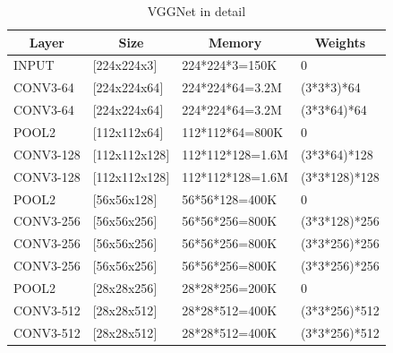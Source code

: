 \documentclass[a4paper]{article}
\theoremstyle{definition}
\theoremstyle{plain}
\begin{document}
\begin{table}[H]
\centering
\caption{VGGNet in detail}
\begin{tabular}{llll}
\hline
\multicolumn{1}{c}{\textbf{Layer}} & \multicolumn{1}{c}{\textbf{Size}} & \multicolumn{1}{c}{\textbf{Memory}} & \multicolumn{1}{c}{\textbf{Weights}} \\ \hline
INPUT                              & {[}224x224x3{]}                   & 224*224*3=150K                      & 0                        \\
CONV3-64                           & {[}224x224x64{]}                  & 224*224*64=3.2M                     & (3*3*3)*64               \\
CONV3-64                           & {[}224x224x64{]}                  & 224*224*64=3.2M                     & (3*3*64)*64              \\
POOL2                              & {[}112x112x64{]}                  & 112*112*64=800K                     & 0                        \\
CONV3-128                          & {[}112x112x128{]}                 & 112*112*128=1.6M                    & (3*3*64)*128             \\
CONV3-128                          & {[}112x112x128{]}                 & 112*112*128=1.6M                    & (3*3*128)*128            \\
POOL2                              & {[}56x56x128{]}                   & 56*56*128=400K                      & 0                        \\
CONV3-256                          & {[}56x56x256{]}                   & 56*56*256=800K                      & (3*3*128)*256            \\
CONV3-256                          & {[}56x56x256{]}                   & 56*56*256=800K                      & (3*3*256)*256            \\
CONV3-256                          & {[}56x56x256{]}                   & 56*56*256=800K                      & (3*3*256)*256            \\
POOL2                              & {[}28x28x256{]}                   & 28*28*256=200K                      & 0                        \\
CONV3-512                          & {[}28x28x512{]}                   & 28*28*512=400K                      & (3*3*256)*512            \\
CONV3-512                          & {[}28x28x512{]}                   & 28*28*512=400K                      & (3*3*256)*512            \\

\end{tabular}
\end{table}
\end{document}

